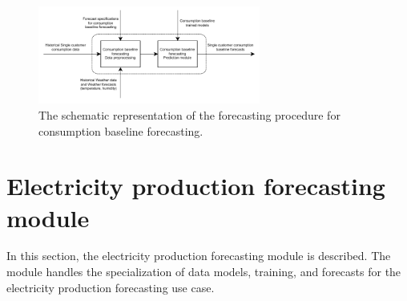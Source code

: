 \begin{figure}[H]
\centering
\includegraphics[width=0.65\textwidth]{images/system_model_forecasting_baseline}
\caption{The schematic representation of the forecasting procedure for consumption baseline forecasting.}
\label{fig:modelforecastingbaseline}
\end{figure}


\section{Electricity production forecasting module}
\label{sec:productionmodel}
\vspace{0.2 cm}

In this section, the electricity production forecasting module is described.
The module handles the specialization of data models, training, and forecasts for the electricity production forecasting use case.

